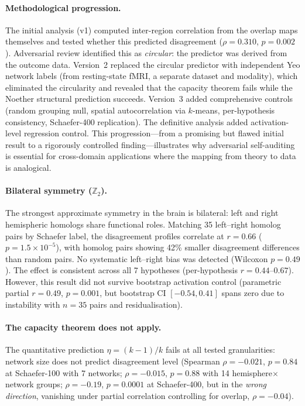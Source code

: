 \documentclass[11pt,a4paper]{article}
\begin{document}
\paragraph{Methodological progression.}
The initial analysis (v1) computed inter-region correlation from the overlap maps themselves and tested whether this predicted disagreement ($\rho = 0.310$, $p = 0.002$).  Adversarial review identified this as \emph{circular}: the predictor was derived from the outcome data.  Version~2 replaced the circular predictor with independent Yeo network labels (from resting-state fMRI, a separate dataset and modality), which eliminated the circularity and revealed that the capacity theorem fails while the Noether structural prediction succeeds.  Version~3 added comprehensive controls (random grouping null, spatial autocorrelation via $k$-means, per-hypothesis consistency, Schaefer-400 replication).  The definitive analysis added activation-level regression control.  This progression---from a promising but flawed initial result to a rigorously controlled finding---illustrates why adversarial self-auditing is essential for cross-domain applications where the mapping from theory to data is analogical.

\paragraph{Bilateral symmetry ($\mathbb{Z}_2$).}
The strongest approximate symmetry in the brain is bilateral: left and right hemispheric homologs share functional roles.  Matching 35 left--right homolog pairs by Schaefer label, the disagreement profiles correlate at $r = 0.66$ ($p = 1.5 \times 10^{-5}$), with homolog pairs showing 42\% smaller disagreement differences than random pairs.  No systematic left--right bias was detected (Wilcoxon $p = 0.49$).  The effect is consistent across all 7 hypotheses (per-hypothesis $r = 0.44$--$0.67$).  However, this result did not survive bootstrap activation control (parametric partial $r = 0.49$, $p = 0.001$, but bootstrap CI $[-0.54, 0.41]$ spans zero due to instability with $n = 35$ pairs and residualisation).

\paragraph{The capacity theorem does not apply.}
The quantitative prediction $\eta = (k-1)/k$ fails at all tested granularities: network size does not predict disagreement level (Spearman $\rho = -0.021$, $p = 0.84$ at Schaefer-100 with 7 networks; $\rho = -0.015$, $p = 0.88$ with 14 hemisphere$\times$network groups; $\rho = -0.19$, $p = 0.0001$ at Schaefer-400, but in the \emph{wrong direction}, vanishing under partial correlation controlling for overlap, $\rho = -0.04$).
\end{document}
